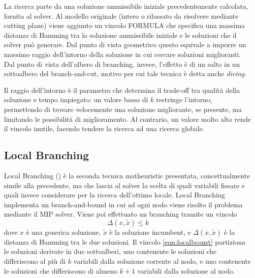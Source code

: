 La ricerca parte da una soluzione ammissibile iniziale precedentemente calcolata, fornita al solver. Al modello originale (intero o rilassato da risolvere mediante cutting plane) viene aggiunto un vincolo
FORMULA
che specifica una massima distanza di Hamming tra la soluzione ammissibile iniziale e le soluzioni che il solver può generare. Dal punto di vista geometrico questo equivale a imporre un massimo raggio dell’intorno della soluzione in cui cercare soluzioni miglioranti. Dal punto di vista dell’albero di branching, invece, l’effetto è di un salto in un sottoalbero del branch-and-cut, motivo per cui tale tecnica è detta anche \textit{diving}.

Il raggio dell’intorno è il parametro che determina il trade-off tra qualità della soluzione e tempo impiegato: un valore basso di $k$ restringe l’intorno, permettendo di trovare velocemente una soluzione migliorante, se presente, ma limitando le possibilità di miglioramento. Al contrario, un valore molto alto rende il vincolo inutile, facendo tendere la ricerca ad una ricerca globale.

\subsection{Local Branching}
Local Branching (\citet*{fischetti2003local}) è la seconda tecnica matheuristic presentata, concettualmente simile alla precedente, ma che lascia al solver la scelta di quali variabili fissare e quali invece considerare per la ricerca dell’ottimo locale. Local Branching implementa un branch-and-bound in cui ad ogni nodo viene risolto il problema mediante il MIP solver. Viene poi effettuato un branching tramite un vincolo 
\begin{equation}
  \Delta(x, \tilde{x}) \leq k \label{eqn:localbconst}
\end{equation}
dove $x$ è una generica soluzione, $\tilde{x}$ è la soluzione incumbent, e $\Delta(x, \tilde{x})$ è la distanza di Hamming tra le due soluzioni. Il vincolo \ref{eqn:localbconst} partiziona le soluzioni derivate in due sottoalberi, uno contenente le soluzioni che differiscono al più di $k$ variabili dalla soluzione corrente al nodo, e uno contenente le soluzioni che differiscono di almeno $k+1$ variabili dalla soluzione al nodo.

